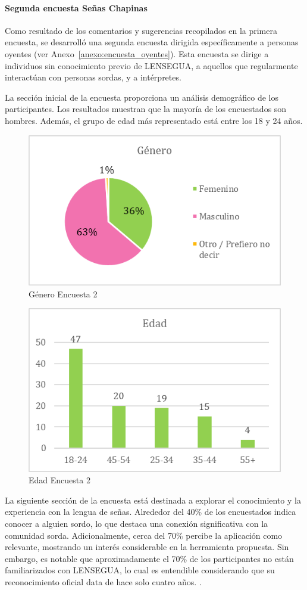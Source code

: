 \paragraph{Segunda encuesta Señas Chapinas}

Como resultado de los comentarios y sugerencias recopilados en la primera encuesta, se desarrolló una segunda encuesta dirigida específicamente a personas oyentes (ver Anexo~\ref{anexo:encuesta_oyentes}). Esta encuesta se dirige a individuos sin conocimiento previo de LENSEGUA, a aquellos que regularmente interactúan con personas sordas, y a intérpretes. 

La sección inicial de la encuesta proporciona un análisis demográfico de los participantes. Los resultados muestran que la mayoría de los encuestados son hombres. Además, el grupo de edad más representado está entre los 18 y 24 años. 

\begin{figure} [H]
    \centering
    \includegraphics[width=0.5\linewidth]{figuras/encuesta_genero.png}
    \caption{Género Encuesta 2}
    \label{fig:enter-label}
\end{figure}

\begin{figure} [H]
    \centering
    \includegraphics[width=0.5\linewidth]{figuras/encuesta_edad.png}
    \caption{Edad Encuesta 2}
    \label{fig:enter-label}
\end{figure}

La siguiente sección de la encuesta está destinada a explorar el conocimiento y la experiencia con la lengua de señas. Alrededor del 40\% de los encuestados indica conocer a alguien sordo, lo que destaca una conexión significativa con la comunidad sorda. Adicionalmente, cerca del 70\% percibe la aplicación como relevante, mostrando un interés considerable en la herramienta propuesta. Sin embargo, es notable que aproximadamente el 70\% de los participantes no están familiarizados con LENSEGUA, lo cual es entendible considerando que su reconocimiento oficial data de hace solo cuatro años. \cite{CongresoGuatemala2020}. 

